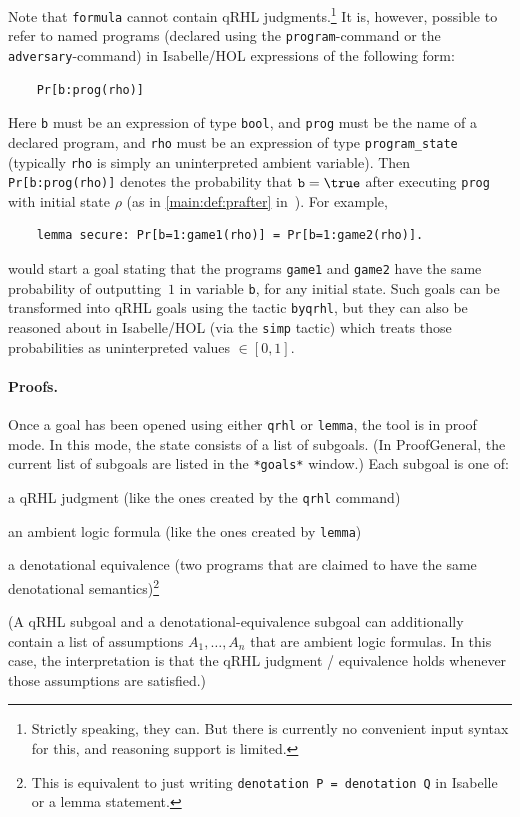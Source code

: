 \documentclass{article}
\newcommand\qrhlautoref[1]{\autoref*{main:#1} in~\cite{qrhl-paper-from-manual}}
\begin{document}
Note that \texttt{formula} cannot contain qRHL judgments.\footnote{Strictly speaking, they can. But there is currently no convenient input syntax for this, and reasoning support is limited.}
It is, however, possible to refer to
named programs (declared using the \texttt{program}-command or the
\texttt{adversary}-command) in Isabelle/HOL expressions of the
following form:
\begin{center}
  \begin{lstlisting}
    Pr[b:prog(rho)]
  \end{lstlisting}
\end{center}
Here \texttt{b} must be an expression of type \texttt{bool},
and \texttt{prog} must be the name of a
declared program, and \texttt{rho} must be an expression of type
\texttt{program\_state} (typically \texttt{rho} is simply an
uninterpreted ambient variable).  Then \texttt{Pr[b:prog(rho)]} 
denotes the probability that $\mathtt{b}=\true$
after executing \texttt{prog} with initial state $\rho$
(as in \qrhlautoref{def:prafter}).  For example,
\begin{center}
  \begin{lstlisting}
    lemma secure: Pr[b=1:game1(rho)] = Pr[b=1:game2(rho)].
  \end{lstlisting}
\end{center}
would start a goal stating that the programs \texttt{game1} and
\texttt{game2} have the same probability of outputting~$1$
in variable \texttt{b}, for any initial state. Such goals can be
transformed into qRHL goals using the tactic \texttt{byqrhl}, but they
can also be reasoned about in Isabelle/HOL (via the \texttt{simp}
tactic) which treats those probabilities as uninterpreted values $\in[0,1]$.


\paragraph{Proofs.} Once a goal has been opened using either
\texttt{qrhl} or \texttt{lemma}, the tool is in proof mode. In this
mode, the state consists of a list of subgoals. (In ProofGeneral, the
current list of subgoals are listed in the \texttt{*goals*} window.)
Each subgoal is one of:
\begin{compactitem}
\item a qRHL judgment (like the ones created by the \texttt{qrhl} command)
\item an ambient logic formula (like the ones created by \texttt{lemma})
\item a denotational equivalence (two programs that are claimed to have the same denotational semantics)\footnote{This is equivalent to just writing \texttt{denotation P = denotation Q} in Isabelle or a lemma statement.}
\end{compactitem}
(A qRHL subgoal and a denotational-equivalence subgoal can additionally contain a
list of assumptions $A_1,\dots,A_n$ that are ambient logic formulas.
In this case, the interpretation is
that the qRHL judgment / equivalence holds whenever those assumptions are satisfied.)
\end{document}
